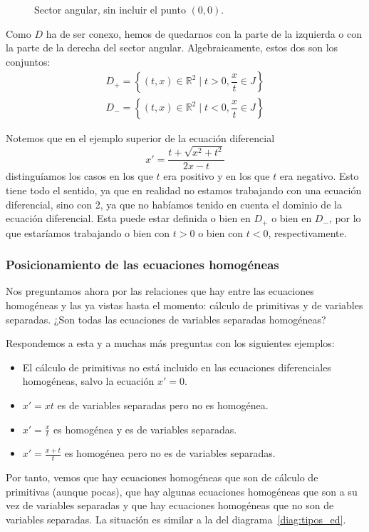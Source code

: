 \begin{itemize}
\begin{figure}[H]
\caption{Sector angular, sin incluir el punto $(0,0)$.}
\label{fig:sector_angular}
\end{figure}

Como $D$ ha de ser conexo, hemos de quedarnos con la parte de la izquierda o con la parte de la derecha del sector angular. Algebraicamente, estos dos son los conjuntos:
\begin{gather*}
    D_+ = \left\{(t,x)\in \mathbb{R}^2 \mid t > 0, \dfrac{x}{t}\in J\right\}\\
    D_- = \left\{(t,x)\in \mathbb{R}^2 \mid t < 0, \dfrac{x}{t}\in J\right\}
\end{gather*}
\end{itemize}

\begin{observacion}
Notemos que en el ejemplo superior de la ecuación diferencial    
\begin{equation*}
    x' = \dfrac{t+\sqrt{x^2+t^2}}{2x-t}
\end{equation*}
distinguíamos los casos en los que $t$ era positivo y en los que $t$ era negativo. Esto tiene todo el sentido, ya que en realidad no estamos trabajando con una ecuación diferencial, sino con 2, ya que no habíamos tenido en cuenta el dominio de la ecuación diferencial. Esta puede estar definida o bien en $D_+$ o bien en $D_-$, por lo que estaríamos trabajando o bien con $t>0$ o bien con $t<0$, respectivamente.
\end{observacion}

\subsubsection{Posicionamiento de las ecuaciones homogéneas}
Nos preguntamos ahora por las relaciones que hay entre las ecuaciones homogéneas y las ya vistas hasta el momento: cálculo de primitivas y de variables separadas. ¿Son todas las ecuaciones de variables separadas homogéneas?

Respondemos a esta y a muchas más preguntas con los siguientes ejemplos:
\begin{itemize}
    \item El cálculo de primitivas no está incluido en las ecuaciones diferenciales homogéneas, salvo la ecuación $x' = 0$.
    \item $x' = xt$ es de variables separadas pero no es homogénea.
    \item $x' = \frac{x}{t}$ es homogénea y es de variables separadas.
    \item $x' = \frac{x+t}{t}$ es homogénea pero no es de variables separadas.
\end{itemize}
Por tanto, vemos que hay ecuaciones homogéneas que son de cálculo de primitivas (aunque pocas), que hay algunas ecuaciones homogéneas que son a su vez de variables separadas y que hay ecuaciones homogéneas que no son de variables separadas. La situación es similar a la del diagrama~\ref{diag:tipos_ed}.

